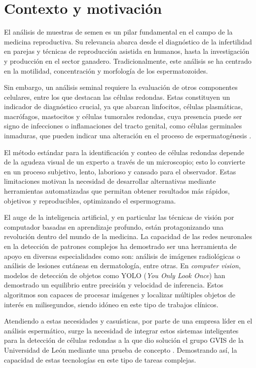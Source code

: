 \documentclass[12pt,a4paper,onecolumn,oneside]{report}
\begin{document}
\section{Contexto y motivación}
\label{sec:Contexto y motivación}

El análisis de muestras de semen es un pilar fundamental en el campo de la medicina reproductiva. Su relevancia abarca desde el diagnóstico 
de la infertilidad en parejas y técnicas de reproducción asistida en humanos, hasta la investigación y producción en el sector ganadero. Tradicionalmente,
este análisis se ha centrado en la motilidad, concentración y morfología de los espermatozoides.

Sin embargo, un análisis seminal requiere la evaluación de otros componentes celulares, entre los que destacan las células redondas. 
Estas constituyen un indicador de diagnóstico crucial, ya que abarcan linfocitos, células plasmáticas, macrófagos, mastocitos y células tumorales redondas, cuya presencia puede ser signo de infecciones o inflamaciones 
del tracto genital, como células germinales inmaduras, que pueden indicar una alteración en el proceso de espermatogénesis \cite{HamiltonThorneRoundCells}.

El método estándar para la identificación y conteo de células redondas depende de la agudeza visual de un experto a través de un microscopio; esto lo convierte en
un proceso subjetivo, lento, laborioso y cansado para el observador. Estas limitaciones motivan la necesidad 
de desarrollar alternativas mediante herramientas automatizadas que permitan obtener resultados más rápidos, objetivos y reproducibles, optimizando el espermograma.

El auge de la inteligencia artificial, y en particular las técnicas de visión por computador basadas en aprendizaje profundo, están protagonizando una revolución dentro del mundo de la medicina.
La capacidad de las redes neuronales en la detección de patrones complejos ha demostrado ser una herramienta de apoyo en diversas especialidades como son: análisis de imágenes radiológicas o análisis de lesiones cutáneas en dermatología, entre otras.
En \textit{computer vision}, modelos de detección de objetos como YOLO (\textit{You Only Look Once}) \cite{ultralytics_models} han demostrado un equilibrio entre precisión y velocidad de inferencia. Estos algoritmos son capaces 
de procesar imágenes y localizar múltiples objetos de interés en milisegundos, siendo idóneo en este tipo de trabajos clínicos.

Atendiendo a estas necesidades y casuísticas, por parte de una empresa líder en el análisis espermático, surge la necesidad de integrar estos sistemas inteligentes para la detección de células redondas a la que dio solución el grupo GVIS de la 
Universidad de León mediante una prueba de concepto \cite{HamiltonThorneRoundCells}. Demostrando así, la capacidad de estas tecnologías en este tipo de tareas complejas.
\end{document}
